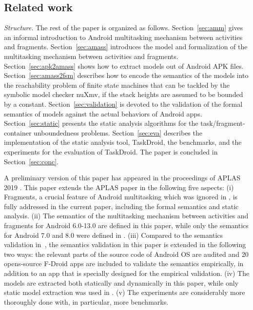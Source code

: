 
\subsection{Related work}\label{sec:related}

\medskip
 
\noindent\emph{Structure.} The rest of the paper is organized as follows. 
Section~\ref{sec:amm} gives an informal introduction to Android multitasking mechanism between activities and fragments. Section~\ref{sec:amass} introduces the model {\AMASS} and formalization of the multitasking mechanism  between activities and fragments. Section~\ref{sec:apk2amass} shows how to extract {\AMASS} models out of Android APK files. Section~\ref{sec:amass2fsm} describes how to encode the semantics of the {\AMASS} models into the reachability problem of finite state machines  that can be tackled by the symbolic model checker nuXmv, if the stack heights are assumed to be bounded by a constant. Section~\ref{sec:validation} is devoted to the validation of the formal semantics of {\AMASS} models against the actual behaviors of Android apps. 
Section~\ref{sec:static} presents the static analysis algorithms for the task/fragment-container unboundedness problems. 
Section~\ref{sec:eva} describes the implementation of the static analysis tool, TaskDroid, the benchmarks, and the experiments for the evaluation of TaskDroid. %
The paper is concluded in Section~\ref{sec:conc}. 

\medskip

A preliminary version of this paper has appeared in the proceedings of APLAS 2019 \cite{HCWWY19}. This paper extends the APLAS paper in the following five aspects: (i) Fragments, a crucial feature of Android multitasking which was ignored in \cite{HCWWY19}, is fully addressed in the current paper, including the formal semantics and static analysis. (ii) The semantics of the multitasking mechanism between activities and fragments for Android 6.0-13.0 are defined in this paper, while only the semantics for Android 7.0 and 8.0 were defined in \cite{HCWWY19}. (iii) Compared to the semantics validation in~\cite{HCWWY19}, the semantics validation in this paper is extended in the following two ways: the relevant parts of the source code of Android OS are audited and 20 opens-source F-Droid apps are included to validate the semantics empirically, in addition to an app that is specially designed for the empirical validation. (iv) The models are extracted both statically and dynamically in this paper, while only static model extraction was used in \cite{HCWWY19}. (v) The experiments are considerably more thoroughly done with, in particular, more benchmarks.
 
